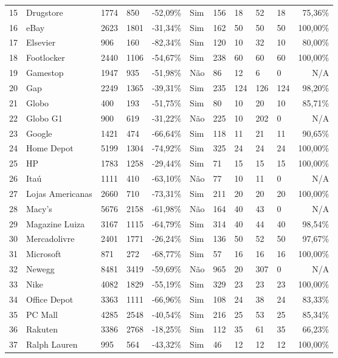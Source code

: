 \documentclass{beamer}
\begin{document}
{\begin{tiny}
\begin{table}[H]
\begin{tabular}{p{1mm}| p{12mm}| p{3mm} p{6mm} p{9mm}| p{6mm}| p{2mm} p{2mm} |
p{2mm} p{2mm} |r}
15 & Drugstore & 1774 & 850 & -52,09\% & Sim & 156 & 18 & 52 & 18 & 75,36\% \\
16 & eBay & 2623 & 1801 & -31,34\% & Sim & 162 & 50 & 50 & 50 & 100,00\% \\
17 & Elsevier & 906 & 160 & -82,34\% & Sim & 120 & 10 & 32 & 10 & 80,00\% \\
18 & Footlocker & 2440 & 1106 & -54,67\% & Sim & 238 & 60 & 60 & 60 & 100,00\% \\
19 & Gamestop & 1947 & 935 & -51,98\% & Não & 86 & 12 & 6 & 0 & N/A \\
20 & Gap & 2249 & 1365 & -39,31\% & Sim & 235 & 124 & 126 & 124 & 98,20\% \\
21 & Globo & 400 & 193 & -51,75\% & Sim & 80 & 10 & 20 & 10 & 85,71\% \\
22 & Globo G1 & 900 & 619 & -31,22\% & Não & 225 & 10 & 202 & 0 & N/A \\
23 & Google & 1421 & 474 & -66,64\% & Sim & 118 & 11 & 21 & 11 & 90,65\% \\
24 & Home Depot & 5199 & 1304 & -74,92\% & Sim & 325 & 24 & 24 & 24 & 100,00\% \\
25 & HP & 1783 & 1258 & -29,44\% & Sim & 71 & 15 & 15 & 15 & 100,00\% \\
26 & Itaú & 1111 & 410 & -63,10\% & Não & 77 & 10 & 11 & 0 & N/A \\
27 & Lojas Americanas & 2660 & 710 & -73,31\% & Sim & 211 & 20 & 20 & 20 & 100,00\% \\
28 & Macy's & 5676 & 2158 & -61,98\% & Não & 164 & 40 & 43 & 0 & N/A \\
29 & Magazine Luiza & 3167 & 1115 & -64,79\% & Sim & 314 & 40 & 44 & 40 & 98,54\% \\
30 & Mercadolivre & 2401 & 1771 & -26,24\% & Sim & 136 & 50 & 52 & 50 & 97,67\% \\
31 & Microsoft & 871 & 272 & -68,77\% & Sim & 57 & 16 & 16 & 16 & 100,00\% \\
32 & Newegg & 8481 & 3419 & -59,69\% & Não & 965 & 20 & 307 & 0 & N/A \\
33 & Nike & 4082 & 1829 & -55,19\% & Sim & 329 & 23 & 23 & 23 & 100,00\% \\
34 & Office Depot & 3363 & 1111 & -66,96\% & Sim & 108 & 24 & 38 & 24 & 83,33\% \\
35 & PC Mall & 4285 & 2548 & -40,54\% & Sim & 216 & 25 & 53 & 25 & 85,34\% \\
36 & Rakuten & 3386 & 2768 & -18,25\% & Sim & 112 & 35 & 61 & 35 & 66,23\% \\
37 & Ralph Lauren & 995 & 564 & -43,32\% & Sim & 46 & 12 & 12 & 12 & 100,00\% \\

\end{tabular}
\end{table}
\end{tiny}}
\end{document}
